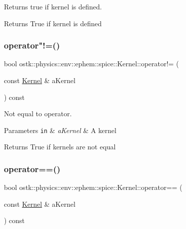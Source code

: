 Returns true if kernel is defined. 

\begin{DoxyReturn}{Returns}
True if kernel is defined 
\end{DoxyReturn}
\mbox{\label{classostk_1_1physics_1_1env_1_1ephem_1_1spice_1_1_kernel_a1b2d11521cac8056058e774eee8082ae}} 
\subsubsection{\texorpdfstring{operator"!=()}{operator!=()}}
{\footnotesize\ttfamily bool ostk\+::physics\+::env\+::ephem\+::spice\+::\+Kernel\+::operator!= (\begin{DoxyParamCaption}\item[{const \hyperlink{classostk_1_1physics_1_1env_1_1ephem_1_1spice_1_1_kernel}{Kernel} \&}]{a\+Kernel }\end{DoxyParamCaption}) const}



Not equal to operator. 


\begin{DoxyParams}[1]{Parameters}
\mbox{\tt in}  & {\em a\+Kernel} & A kernel \\
\hline
\end{DoxyParams}
\begin{DoxyReturn}{Returns}
True if kernels are not equal 
\end{DoxyReturn}
\mbox{\label{classostk_1_1physics_1_1env_1_1ephem_1_1spice_1_1_kernel_a4499b4c8a89b9aa99fe90bac124e89ef}} 
\subsubsection{\texorpdfstring{operator==()}{operator==()}}
{\footnotesize\ttfamily bool ostk\+::physics\+::env\+::ephem\+::spice\+::\+Kernel\+::operator== (\begin{DoxyParamCaption}\item[{const \hyperlink{classostk_1_1physics_1_1env_1_1ephem_1_1spice_1_1_kernel}{Kernel} \&}]{a\+Kernel }\end{DoxyParamCaption}) const}



